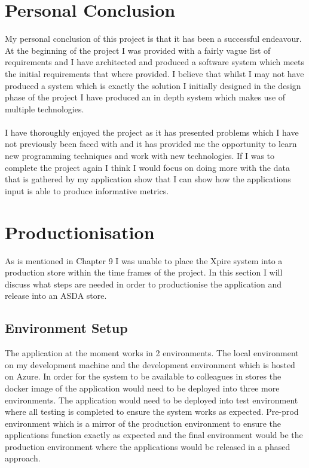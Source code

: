 \documentclass[a4paper,11pt]{report}
\begin{document}
\section{Personal Conclusion}
My personal conclusion of this project is that it has been a successful endeavour. At the beginning of the project I was provided with a fairly vague list of requirements and I have architected and produced a software system which meets the initial requirements that where provided. I believe that whilst I may not have produced a system which is exactly the solution I initially designed in the design phase of the project I have produced an in depth system which makes use of multiple technologies. 
\\
\\
I have thoroughly enjoyed the project as it has presented problems which I have not previously been faced with and it has provided me the opportunity to learn new programming techniques and work with new technologies. If I was to complete the project again I think I would focus on doing more with the data that is gathered by my application show that I can show how the applications input is able to produce informative metrics. 
\section{Productionisation}
As is mentioned in Chapter 9 I was unable to place the Xpire system into a production store within the time frames of the project. In this section I will discuss what steps are needed in order to productionise the application and release into an ASDA store. 
\subsection{Environment Setup}
The application at the moment works in 2 environments. The local environment on my development machine and the development environment which is hosted on Azure. In order for the system to be available to colleagues in stores the docker image of the application would need to be deployed into three more environments. The application would need to be deployed into test environment where all testing is completed to ensure the system works as expected. Pre-prod environment which is a mirror of the production environment to ensure the applications function exactly as expected and the final environment would be the production environment where the applications would be released in a phased approach. 
\end{document}
